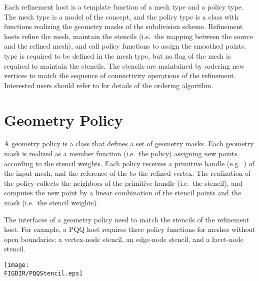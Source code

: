 
Each refinement host is a template function of
a mesh type and a policy type. The mesh type is
a model of the  concept, and the
policy type is a class with functions realizing the 
geometry masks of the subdivision scheme.
Refinement hosts refine the mesh, maintain the stencils 
(i.e.~the mapping between the source and the refined mesh), 
and call policy functions
to assign the smoothed points.  type is required
to be defined in the mesh type, but no flag of the mesh 
is required to maintain the stencils. The stencils are maintained
by ordering new vertices to match the sequence of connectivity 
operations of the refinement. Interested users should 
refer to \cite{cgal:shiue-mreo-05} for details of the 
ordering algorithm.

\section{Geometry Policy}
A geometry policy is a class that defines a set of geometry masks. 
Each geometry mask is realized as a member function (i.e.~the policy) 
assigning new points according to the stencil weights.
Each policy receives a primitive handle 
(e.g.~) of the input mesh, and the reference of 
the  to the refined vertex. The realization of the policy
collects the neighbors of the primitive handle (i.e.~the stencil),
and computes the new point by a linear combination of the stencil 
points and the mask (i.e.~the stencil weights).

The interfaces of a geometry policy need to match the stencils of 
the refinement host. For example, a PQQ host requires three 
policy functions for meshes without open boundaries: a vertex-node 
stencil, an edge-node stencil, and a facet-node stencil. 

\begin{ccTexOnly}
  \begin{center}
    \parbox{0.5\textwidth}{%
      \texttt{[image: \\FIGDIR/PQQStencil.eps]}%
    }
  \end{center}
\end{ccTexOnly}

